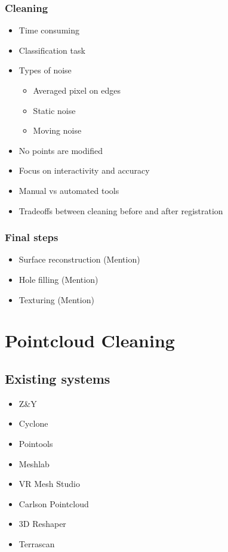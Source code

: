 		\subsubsection{Cleaning}
			\begin{itemize}
			\item Time consuming
			\item Classification task
			\item Types of noise
				\begin{itemize}
				\item Averaged pixel on edges
				\item Static noise
				\item Moving noise
				\end{itemize}
			\item No points are modified
			\item Focus on interactivity and accuracy
			\item Manual vs automated tools
			\item Tradeoffs between cleaning before and after registration
			\end{itemize}

		\subsubsection{Final steps}
			\begin{itemize}
			\item Surface reconstruction (Mention)
			\item Hole filling (Mention)
			\item Texturing (Mention)
			\end{itemize}


\section{Pointcloud Cleaning}
	\subsection{Existing systems}
		\begin{itemize}
		\item Z&Y
		\item Cyclone
		\item Pointools
		\item Meshlab
		\item VR Mesh Studio
		\item Carlson Pointcloud
		\item 3D Reshaper
		\item Terrascan
		\end{itemize}

